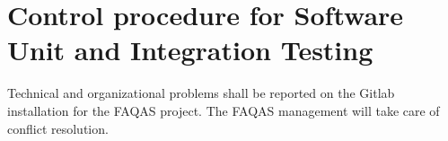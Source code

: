 
\chapter{Control procedure for Software Unit and Integration Testing}


Technical and organizational problems shall be reported on the Gitlab installation for the FAQAS project. The FAQAS management will take care of conflict resolution.
